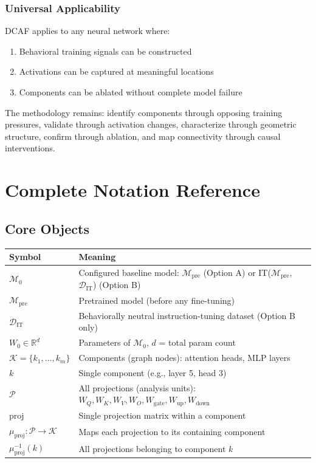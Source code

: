 \documentclass[11pt]{article}
\begin{document}
\subsubsection{Universal Applicability}
\label{sec:universal-applicability}

DCAF applies to any neural network where:
\begin{enumerate}[nosep]
\item Behavioral training signals can be constructed
\item Activations can be captured at meaningful locations
\item Components can be ablated without complete model failure
\end{enumerate}

The methodology remains: identify components through opposing training pressures, validate through activation changes, characterize through geometric structure, confirm through ablation, and map connectivity through causal interventions.

\section{Complete Notation Reference}
\label{app:notation}

\subsection{Core Objects}
\label{app:notation-core-objects}

\begin{center}
\begin{tabular}{ll}
\toprule
\textbf{Symbol} & \textbf{Meaning} \\
\midrule
$\mathcal{M}_0$ & Configured baseline model: $\mathcal{M}_{\text{pre}}$ (Option A) or IT($\mathcal{M}_{\text{pre}}$, $\mathcal{D}_{\text{IT}}$) (Option B) \\
$\mathcal{M}_{\text{pre}}$ & Pretrained model (before any fine-tuning) \\
$\mathcal{D}_{\text{IT}}$ & Behaviorally neutral instruction-tuning dataset (Option B only) \\
$W_0 \in \mathbb{R}^d$ & Parameters of $\mathcal{M}_0$, $d$ = total param count \\
$\mathcal{K} = \{k_1, \ldots, k_m\}$ & Components (graph nodes): attention heads, MLP layers \\
$k$ & Single component (e.g., layer 5, head 3) \\
$\mathcal{P}$ & All projections (analysis units): $W_Q, W_K, W_V, W_O, W_{\text{gate}}, W_{\text{up}}, W_{\text{down}}$ \\
$\text{proj}$ & Single projection matrix within a component \\
$\mu_{\text{proj}}: \mathcal{P} \to \mathcal{K}$ & Maps each projection to its containing component \\
$\mu_{\text{proj}}^{-1}(k)$ & All projections belonging to component $k$ \\
\bottomrule
\end{tabular}
\end{center}
\end{document}
